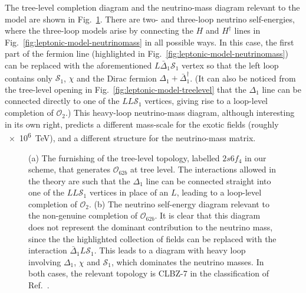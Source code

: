 The tree-level completion diagram and the neutrino-mass diagram relevant to the
model are shown in Fig.~\ref{fig:leptonic-model-diagrams}. There are two- and
three-loop neutrino self-energies, where the three-loop models arise by
connecting the $H$ and $H^{\dagger}$ lines in
Fig.~\ref{fig:leptonic-model-neutrinomass} in all possible ways. In this case,
the first part of the fermion line (highlighted in
Fig.~\ref{fig:leptonic-model-neutrinomass}) can be replaced with the
aforementioned $L\bar{\Delta}_{1}\mathcal{S}_{1}$ vertex so that the left loop
contains only $\mathcal{S}_{1}$, $\chi$ and the Dirac fermion
$\Delta_{1} + \bar{\Delta}_{1}^{\dagger}$. (It can also be noticed from the
tree-level opening in Fig.~\ref{fig:leptonic-model-treelevel} that the
$\Delta_{1}$ line can be connected directly to one of the $LL\mathcal{S}_{1}$
vertices, giving rise to a loop-level completion of $\mathcal{O}_{2}$.) This
heavy-loop neutrino-mass diagram, although interesting in its own right,
predicts a different mass-scale for the exotic fields (roughly \SI{e6}{\TeV}),
and a different structure for the neutrino-mass matrix.

\begin{figure}[t]
  \centering
  \caption{(a) The furnishing of the tree-level topology, labelled $2s6f_4$ in
    our scheme, that generates $\mathcal{O}_{62b}$ at tree level. The
    interactions allowed in the theory are such that the $\Delta_{1}$ line can
    be connected straight into one of the $LL\mathcal{S}_{1}$ vertices in place
    of an $L$, leading to a loop-level completion of $\mathcal{O}_{2}$. (b) The
    neutrino self-energy diagram relevant to the non-genuine completion of
    $\mathcal{O}_{62b}$. It is clear that this diagram does not represent the
    dominant contribution to the neutrino mass, since the the highlighted
    collection of fields can be replaced with the interaction
    $\bar{\Delta}_{1} L \mathcal{S}_{1}$. This leads to a diagram with heavy
    loop involving $\Delta_{1}$, $\chi$ and $\mathcal{S}_{1}$, which dominates
    the neutrino masses. In both cases, the relevant topology is CLBZ-7 in the
    classification of Ref.~\cite{Sierra:2014rxa}.}
  \label{fig:leptonic-model-diagrams}
\end{figure}

